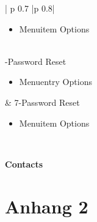 \begin{minipage}{0.7\textwidth}
\begin{longtable}{| p {0.7\textwidth} |p {0.8\textwidth}|}
\begin{itemize}
\item Menuitem Options
\end{itemize}
\\ -Password Reset
\begin{itemize}
\item Menuentry Options
\end{itemize}
&
7-Password Reset
\begin{itemize}
\item Menuitem Options
\end{itemize}
\\ \hline
\end{longtable}
\end{minipage}


\textbf{Contacts}


\chapter{Anhang 2}

